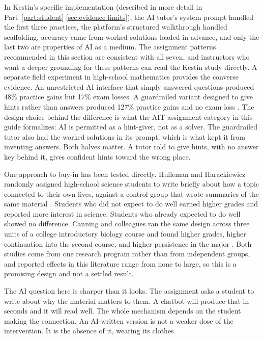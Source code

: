 \documentclass{SIAMbook2023}
\begin{document}
In Kestin's specific implementation (described in more detail in Part~\ref{part:student} \cref{sec:evidence-limits}), the AI tutor's system prompt handled the first three practices, the platform's structured walkthrough handled scaffolding, accuracy came from worked solutions loaded in advance, and only the last two are properties of AI as a medium. The assignment patterns recommended in this section are consistent with all seven, and instructors who want a deeper grounding for these patterns can read the Kestin study directly. A separate field experiment in high-school mathematics provides the converse evidence. An unrestricted AI interface that simply answered questions produced 48\% practice gains but 17\% exam losses. A guardrailed variant designed to give hints rather than answers produced 127\% practice gains and no exam loss \citep{bastani2025generative}. The design choice behind the difference is what the AIT assignment category in this guide formalizes: AI is permitted as a hint-giver, not as a solver. The guardrailed tutor also had the worked solutions in its prompt, which is what kept it from inventing answers. Both halves matter. A tutor told to give hints, with no answer key behind it, gives confident hints toward the wrong place.

%
One approach to buy-in has been tested directly. Hulleman and Harackiewicz randomly assigned high-school science students to write briefly about how a topic connected to their own lives, against a control group that wrote summaries of the same material \citep{hulleman2009promoting}. Students who did not expect to do well earned higher grades and reported more interest in science. Students who already expected to do well showed no difference. Canning and colleagues ran the same design across three units of a college introductory biology course and found higher grades, higher continuation into the second course, and higher persistence in the major \citep{canning2018improving}. Both studies come from one research program rather than from independent groups, and reported effects in this literature range from none to large, so this is a promising design and not a settled result.

The AI question here is sharper than it looks. The assignment asks a student to write about why the material matters to them. A chatbot will produce that in seconds and it will read well. The whole mechanism depends on the student making the connection. An AI-written version is not a weaker dose of the intervention. It is the absence of it, wearing its clothes.
\end{document}
